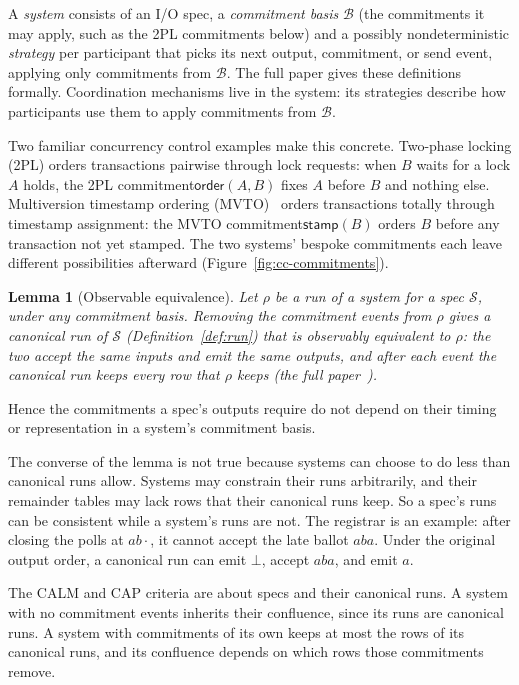 \documentclass[sigconf]{cidr-2027}
\newtheorem{lemma}{Lemma}
\theoremstyle{remark}
\newcommand{\commitment}{commitment\xspace}
\newcommand{\commitments}{commitments\xspace}
\newcommand{\Spec}{\mathcal{S}}
\newcommand{\extended}{the full paper~\cite{hellerstein2026completecalmfull}}
\begin{document}
A \emph{system} consists of an I/O spec, a \emph{\commitment basis} $\mathcal B$ (the \commitments it may apply, such
as the 2PL \commitments below) and a
possibly nondeterministic \emph{strategy} per participant that picks its next output,
\commitment, or send event, applying only
\commitments from $\mathcal B$.  The full paper gives these definitions formally.
Coordination mechanisms live in the system: its
strategies describe how participants use them to apply \commitments from $\mathcal B$.

Two familiar concurrency control examples make this concrete. Two-phase locking
(2PL) orders transactions pairwise through lock requests: when $B$ waits for a
lock $A$ holds, the 2PL \commitment $\mathsf{order}(A,B)$ fixes $A$ before $B$ and nothing else.
Multiversion timestamp ordering (MVTO)~\cite{bernstein1981concurrency} orders transactions totally through timestamp
assignment: the MVTO \commitment $\mathsf{stamp}(B)$ orders $B$ before any transaction not yet
stamped. The two systems' bespoke \commitments each leave different possibilities
afterward (Figure~\ref{fig:cc-commitments}).

\begin{lemma}[Observable equivalence]
\label{lem:canonical-equivalent}
Let $\rho$ be a run of a system for a spec $\Spec$, under any \commitment
basis.  Removing the \commitment events from $\rho$ gives a canonical run of
$\Spec$ (Definition~\ref{def:run}) that is \emph{observably equivalent} to
$\rho$: the two accept the same inputs and emit the same outputs, and after each
event the canonical run keeps every row that $\rho$ keeps (\extended).
\end{lemma}

Hence the \commitments a spec's outputs require do not depend on their timing or
representation in a system's \commitment basis.

The converse of the lemma is not true because systems can choose to do less
than canonical runs allow.  Systems may constrain their runs arbitrarily, and
their remainder tables may lack rows that their canonical runs keep.  So a spec's runs
can be consistent while a system's runs are not.  The registrar is an example: after closing the polls at $ab\cdot$, it cannot
accept the late ballot $aba$.  Under the original output order, a canonical run
can emit $\bot$, accept $aba$, and emit $a$.

The CALM and CAP criteria are
about specs and their canonical runs. A system with no \commitment events
inherits their confluence, since its runs are canonical runs. A system
with \commitments of its own keeps at most the rows of its canonical runs, and
its confluence depends on which rows those \commitments remove.
\end{document}
